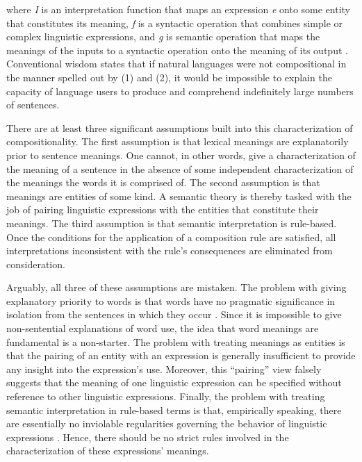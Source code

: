 \noindent
where \textit{I} is an interpretation function that maps an expression \textit{e} onto some entity that constitutes its meaning, \textit{f} is a syntactic operation that combines simple or complex linguistic expressions, and \textit{g} is semantic operation that maps the meanings of the inputs to a syntactic operation onto the meaning of its output \citep{Szabo:2012}. Conventional wisdom states that if natural languages were not compositional in the manner spelled out by (1) and (2), it would be impossible to explain the capacity of language users to produce and comprehend indefinitely large numbers of sentences.

There are at least three significant assumptions built into this characterization of compositionality. The first assumption is that lexical meanings are explanatorily prior to sentence meanings. One cannot, in other words, give a characterization of the meaning of a sentence in the absence of some independent characterization of the meanings the words it is comprised of. The second assumption is that meanings are entities of some kind. A semantic theory is thereby tasked with the job of pairing linguistic expressions with the entities that constitute their meanings. The third assumption is that semantic interpretation is rule-based. Once the conditions for the application of a composition rule are satisfied, all interpretations inconsistent with the rule's consequences are eliminated from consideration.   

Arguably, all three of these assumptions are mistaken. The problem with giving explanatory priority to words is that words have no pragmatic significance in isolation from the sentences in which they occur \citep{Brandom:1994}. Since it is impossible to give non-sentential explanations of word use, the idea that word meanings are fundamental is a non-starter. The problem with treating meanings as entities is that the pairing of an entity with an expression is generally insufficient to provide any insight into the expression's use. Moreover, this ``pairing'' view falsely suggests that the meaning of one linguistic expression can be specified without reference to other linguistic expressions. Finally, the problem with treating semantic interpretation in rule-based terms is that, empirically speaking, there are essentially no inviolable regularities governing the behavior of linguistic expressions \citep{SmolenskyLegendre:2006,Manning:2015,Seidenberg:1997}. Hence, there should be no strict rules involved in the characterization of these expressions' meanings. 

